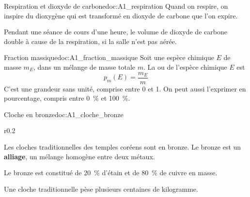 
\begin{doc}{Respiration et dioxyde de carbone}{doc:A1_respiration}
  Quand on respire, on inspire du dioxygène  qui est transformé en dioxyde de carbone  que l'on expire.

  Pendant une séance de cours d'une heure, le volume de dioxyde de carbone  double à cause de la respiration, si la salle n'est pas aérée.
\end{doc}



\begin{doc}{Fraction massique}{doc:A1_fraction_massique}
  Soit une espèce chimique $E$ de masse $m_E$, dans un mélange de masse totale $m$.
  La  ou  de l'espèce chimique $E$ est
  \begin{equation*}
    p_{m}(E) = \frac{m_E}{m}
  \end{equation*}
  C'est une grandeur sans unité, comprise entre 0 et 1.
  On peut aussi l'exprimer en pourcentage, compris entre \qty{0}{\percent} et \qty{100}{\percent}.
\end{doc}

\begin{doc}{Cloche en bronze}{doc:A1_cloche_bronze}
  \begin{wrapfigure}[5]{r}{0.2\linewidth}
    \vspace*{-31pt}
    \centering
  \end{wrapfigure}
  
  Les cloches traditionnelles des temples coréens sont en bronze.
  Le bronze est un \textbf{alliage}, un mélange homogène entre deux métaux.
  
  Le bronze est constitué de \qty{20}{\percent} d'étain  et de \qty{80}{\percent} de cuivre  en masse.

  Une cloche traditionnelle pèse plusieurs centaines de kilogramme.
\end{doc}


